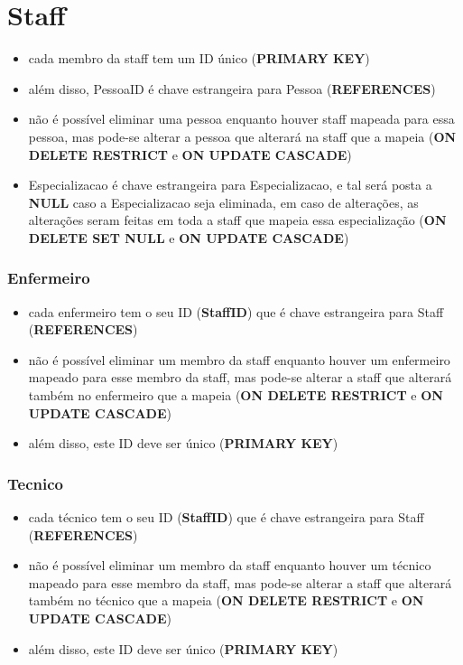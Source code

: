 \documentclass[article, a4paper, 12pt, oneside]{memoir}
\begin{document}
\section*{Staff}
\begin{itemize}
	\item cada membro da staff tem um ID único (\textbf{PRIMARY KEY})
	\item além disso, PessoaID é chave estrangeira para Pessoa (\textbf{REFERENCES})
	\item não é possível eliminar uma pessoa enquanto houver staff mapeada para essa pessoa, mas pode-se alterar a pessoa que alterará na staff que a mapeia (\textbf{ON DELETE RESTRICT} e \textbf{ON UPDATE CASCADE})
	\item Especializacao é chave estrangeira para Especializacao, e tal será posta a \textbf{NULL} caso a Especializacao seja eliminada, em caso de alterações, as alterações seram feitas em toda a staff que mapeia essa especialização (\textbf{ON DELETE SET NULL} e \textbf{ON UPDATE CASCADE})
\end{itemize}

\subsubsection*{Enfermeiro}
\begin{itemize}
	\item cada enfermeiro tem o seu ID (\textbf{StaffID}) que é chave estrangeira para Staff (\textbf{REFERENCES})
	\item não é possível eliminar um membro da staff enquanto houver um enfermeiro mapeado para esse membro da staff, mas pode-se alterar a staff que alterará também no enfermeiro que a mapeia (\textbf{ON DELETE RESTRICT} e \textbf{ON UPDATE CASCADE})
	\item além disso, este ID deve ser único (\textbf{PRIMARY KEY})
\end{itemize}

\subsubsection*{Tecnico}
\begin{itemize}
	\item cada técnico tem o seu ID (\textbf{StaffID}) que é chave estrangeira para Staff (\textbf{REFERENCES})
	\item não é possível eliminar um membro da staff enquanto houver um técnico mapeado para esse membro da staff, mas pode-se alterar a staff que alterará também no técnico que a mapeia (\textbf{ON DELETE RESTRICT} e \textbf{ON UPDATE CASCADE})
	\item além disso, este ID deve ser único (\textbf{PRIMARY KEY})
\end{itemize}
\end{document}
